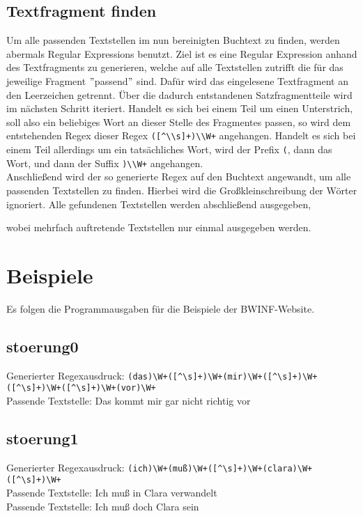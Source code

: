\subsection{Textfragment finden}\label{subsec:textfragment-finden}
Um alle passenden Textstellen im nun bereinigten Buchtext zu finden,
werden abermals Regular Expressions benutzt.
Ziel ist es eine Regular Expression anhand des Textfragments zu generieren, welche auf alle Textstellen zutrifft
die für das jeweilige Fragment \("\)passend\("\) sind.
Dafür wird das eingelesene Textfragment an den Leerzeichen getrennt.
Über die dadurch entstandenen Satzfragmentteile wird im nächsten Schritt iteriert.
Handelt es sich bei einem Teil um einen Unterstrich,
soll also ein beliebiges Wort an dieser Stelle des Fragmentes passen,
so wird dem entstehenden Regex dieser Regex \verb/([^\\s]+)\\W+/ angehangen.
Handelt es sich bei einem Teil allerdings um ein tatsächliches Wort, wird
der Prefix \verb/(/, dann das Wort, und dann der Suffix \verb/)\\W+/ angehangen. \\
Anschließend wird der so generierte Regex auf den Buchtext angewandt, um alle passenden Textstellen zu finden.
Hierbei wird die Großkleinschreibung der Wörter ignoriert.
Alle gefundenen Textstellen werden abschließend ausgegeben,

wobei mehrfach auftretende Textstellen nur einmal ausgegeben werden.


\section{Beispiele}\label{sec:beispiele}
Es folgen die Programmausgaben für die Beispiele der BWINF-Website.

\subsection{stoerung0}\label{subsec:stoerung0}
Generierter Regexausdruck: \verb/(das)\W+([^\s]+)\W+(mir)\W+([^\s]+)\W+([^\s]+)\W+([^\s]+)\W+(vor)\W+/ \\
Passende Textstelle: Das kommt mir gar nicht richtig vor

\subsection{stoerung1}\label{subsec:stoerung1}
Generierter Regexausdruck: \verb/(ich)\W+(muß)\W+([^\s]+)\W+(clara)\W+([^\s]+)\W+/ \\
Passende Textstelle: Ich muß in Clara verwandelt \\
Passende Textstelle: Ich muß doch Clara sein

